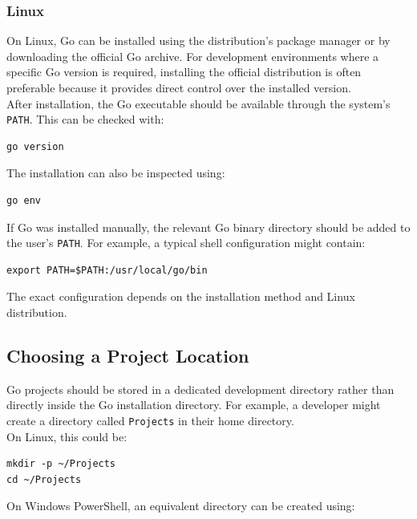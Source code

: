 \subsubsection{Linux}

On Linux, Go can be installed using the distribution's package manager or by downloading the official Go archive. For development environments where a specific Go version is required, installing the official distribution is often preferable because it provides direct control over the installed version.\\

After installation, the Go executable should be available through the system's \texttt{PATH}. This can be checked with:

\begin{lstlisting}
go version
\end{lstlisting}

The installation can also be inspected using:

\begin{lstlisting}
go env
\end{lstlisting}

If Go was installed manually, the relevant Go binary directory should be added to the user's \texttt{PATH}. For example, a typical shell configuration might contain:

\begin{lstlisting}
export PATH=$PATH:/usr/local/go/bin
\end{lstlisting}

The exact configuration depends on the installation method and Linux distribution.

\subsection{Choosing a Project Location}

Go projects should be stored in a dedicated development directory rather than directly inside the Go installation directory. For example, a developer might create a directory called \texttt{Projects} in their home directory.\\

On Linux, this could be:

\begin{lstlisting}
mkdir -p ~/Projects
cd ~/Projects
\end{lstlisting}

On Windows PowerShell, an equivalent directory can be created using:

